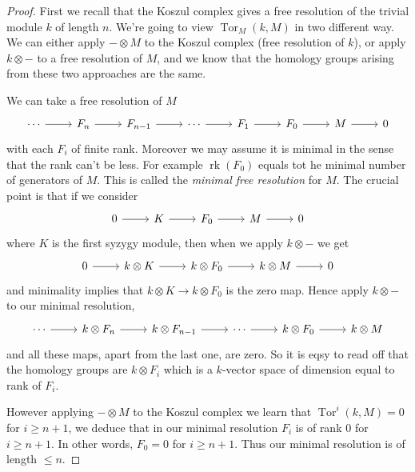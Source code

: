 \documentclass[a4paper]{article}
\DeclareMathOperator{\Tor}{Tor}
\begin{document}
\begin{proof}
  First we recall that the Koszul complex gives a free resolution of the trivial module \(k\) of length \(n\). We're going to view \(\Tor_M(k, M)\) in two different way. We can either apply \(- \otimes M\) to the Koszul complex (free resolution of \(k\)), or apply \(k \otimes -\) to a free resolution of \(M\), and we know that the homology groups arising from these two approaches are the same.

  We can take a free resolution of \(M\)
  \[
    \begin{tikzcd}
      \cdots \ar[r] & F_n \ar[r] & F_{n - 1} \ar[r] & \cdots \ar[r] & F_1 \ar[r] & F_0 \ar[r] & M \ar[r] & 0
    \end{tikzcd}
  \]
  with each \(F_i\) of finite rank. Moreover we may assume it is minimal in the sense that the rank can't be less. For example \(\operatorname{rk}(F_0)\) equals tot he minimal number of generators of \(M\). This is called the \emph{minimal free resolution} for \(M\). The crucial point is that if we consider
  \[
    \begin{tikzcd}
      0 \ar[r] & K \ar[r] & F_0 \ar[r] & M \ar[r] & 0
    \end{tikzcd}
  \]
  where \(K\) is the first syzygy module, then when we apply \(k \otimes -\) we get
  \[
    \begin{tikzcd}
      0 \ar[r] & k \otimes K \ar[r] & k \otimes F_0 \ar[r] & k \otimes M \ar[r] & 0
    \end{tikzcd}
  \]
  and minimality implies that \(k \otimes K \to k \otimes F_0\) is the zero map. Hence apply \(k \otimes -\) to our minimal resolution,
  \[
    \begin{tikzcd}
      \cdots \ar[r] & k \otimes F_n \ar[r] & k \otimes F_{n - 1} \ar[r] & \cdots \ar[r] & k \otimes F_0 \ar[r] & k \otimes M
    \end{tikzcd}
  \]
  and all these maps, apart from the last one, are zero. So it is eqsy to read off that the homology groups are \(k \otimes F_i\) which is a \(k\)-vector space of dimension equal to rank of \(F_i\).

  However applying \(- \otimes M\) to the Koszul complex we learn that \(\Tor^i(k, M) = 0\) for \(i \geq n + 1\), we deduce that in our minimal resolution \(F_i\) is of rank \(0\) for \(i \geq n + 1\). In other words, \(F_0 = 0\) for \(i \geq n + 1\). Thus our minimal resolution is of length \(\leq n\).
\end{proof}
\end{document}
